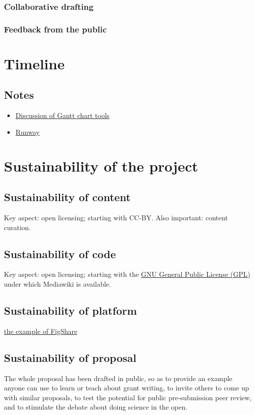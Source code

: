 \documentclass[final,authoryear,3p]{elsarticle-open-drafting}
\begin{document}
\subsubsection{Collaborative drafting}
\subsubsection{Feedback from the public}

\section{Timeline}

\subsection{Notes}
\begin{itemize}
	\item \href{http://ff.im/D6rQ0}{Discussion of Gantt chart tools}
	\item \href{http://openscience.runwaypm.com}{Runway}
\end{itemize}

\section{Sustainability of the project}
\subsection{Sustainability of content}
Key aspect: open licensing; starting with CC-BY.
Also important: content curation.

\subsection{Sustainability of code}
Key aspect: open licensing; starting with the \href{http://www.gnu.org/licenses/gpl.html}{GNU General Public License (GPL)} under which Mediawiki is available.

\subsection{Sustainability of platform}
\href{http://www.pawelszczesny.org/2011/03/02/systems-institute-is-officially-supporting-figshare-backstage-story/}{the example of FigShare}

\subsection{Sustainability of proposal}
The whole proposal has been drafted in public, so as to provide an example anyone can use 
to learn or teach about grant writing, to invite others to come up with similar proposals, to test the potential for public pre-submission peer review, and to stimulate the debate about doing science in the open.
\end{document}
